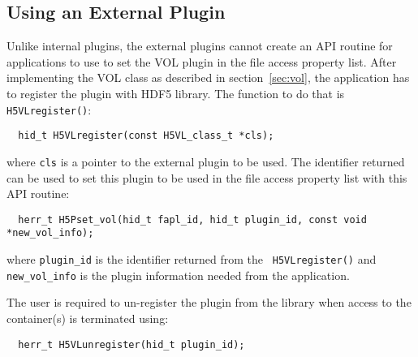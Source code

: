 \subsection{Using an External Plugin}
Unlike internal plugins, the external plugins cannot create an API
routine for applications to use to set the VOL plugin in the file access
property list. After implementing the VOL class as described in
section~\ref{sec:vol}, the application has to register the plugin with
HDF5 library. The function to do that is {\tt H5VLregister()}:
\begin{lstlisting}
  hid_t H5VLregister(const H5VL_class_t *cls);
\end{lstlisting}
where {\tt cls} is a pointer to the external plugin to be used. The
identifier returned can be used to set this plugin to be used in the
file access property list with this API routine:
\begin{lstlisting}
  herr_t H5Pset_vol(hid_t fapl_id, hid_t plugin_id, const void *new_vol_info);
\end{lstlisting}
where {\tt plugin\_id} is the identifier returned from the {\tt
  H5VLregister()} and {\tt new\_vol\_info} is the plugin information
needed from the application. 

The user is required to un-register the plugin from the library when
access to the container(s) is terminated using:
\begin{lstlisting}
  herr_t H5VLunregister(hid_t plugin_id);
\end{lstlisting}


